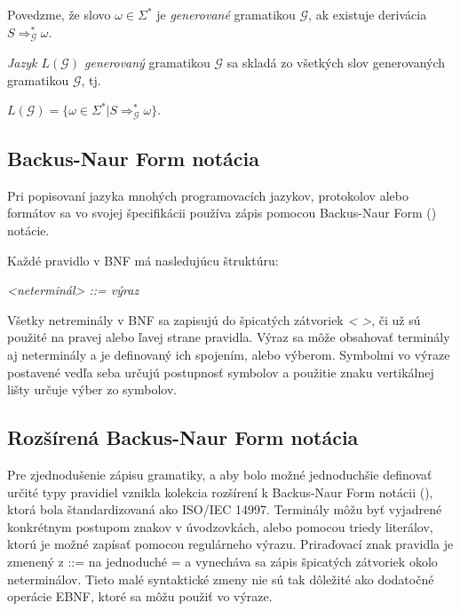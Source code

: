 \begin{definice}
Povedzme, že slovo $\omega \in \Sigma^*$ je \textit{generované} gramatikou $\mathcal{G}$, ak existuje derivácia $S\Rightarrow_\mathcal{G}^*\omega$.

\textit{Jazyk $L(\mathcal{G})$ generovaný} gramatikou $\mathcal{G}$ sa skladá zo všetkých slov generovaných gramatikou $\mathcal{G}$, tj.
\begin{center}
$L(\mathcal{G}) = \{\omega \in \Sigma^* | S \Rightarrow_\mathcal{G}^* \omega\}$.\cite{demlova:gramatiky}
\end{center}
\end{definice}

\subsection{Backus-Naur Form notácia}\label{BNF}
Pri popisovaní jazyka mnohých programovacích jazykov, protokolov alebo formátov sa vo svojej špecifikácii používa zápis pomocou Backus-Naur Form () notácie.\cite{might:languages} 

Každé pravidlo v BNF má nasledujúcu štruktúru:
\begin{center}
\textit{<neterminál> ::= výraz}
\end{center}

Všetky netreminály v BNF sa zapisujú do špicatých zátvoriek \textit{< >}, či už sú použité na pravej alebo ľavej strane pravidla. Výraz sa môže obsahovať terminály aj neterminály a je definovaný ich spojením, alebo výberom. Symbolmi vo výraze postavené vedľa seba určujú postupnosť symbolov a použitie znaku vertikálnej lišty určuje výber zo symbolov.

\subsection{Rozšírená Backus-Naur Form notácia}\label{EBNF}
Pre zjednodušenie zápisu gramatiky, a aby bolo možné jednoduchšie definovať určité typy pravidiel vznikla kolekcia rozšírení k Backus-Naur Form notácii (), ktorá bola štandardizovaná ako ISO/IEC 14997\cite{ISO14977}. Terminály môžu byť vyjadrené konkrétnym postupom znakov v úvodzovkách, alebo pomocou triedy literálov, ktorú je možné zapísať pomocou regulárneho výrazu. Priraďovací znak pravidla je zmenený z ::= na jednoduché = a vynecháva sa zápis špicatých zátvoriek okolo neterminálov. Tieto malé syntaktické zmeny nie sú tak dôležité ako dodatočné operácie EBNF, ktoré sa môžu použiť vo výraze.

